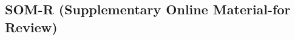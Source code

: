 \documentclass[11pt, letterpaper]{article}
\begin{document}
\begin{spacing}{1.4}

  



  


\section*{\LARGE SOM-R (Supplementary Online Material-for Review)}


\end{spacing}
\end{document}
